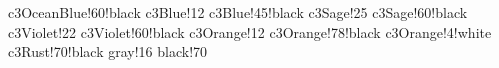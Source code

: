 \documentclass{llmxive}
\providecommand{\cPale}[1]{#1!4!white}
\providecommand{\cLight}[1]{#1!8}
\providecommand{\cFill}[1]{#1!12}
\providecommand{\cTok}[1]{#1!22}
\providecommand{\cSoft}[1]{#1!50!gray}
\providecommand{\cBorder}[1]{#1!50!black}
\begin{document}
      {c3OceanBlue!60!black}%
 {c3Blue!12}%
 {c3Blue!45!black}%
     {c3Sage!25}%
     {c3Sage!60!black}%
    {c3Violet!22}%
    {c3Violet!60!black}%
    {c3Orange!12}%
    {c3Orange!78!black}%
    {c3Orange!4!white}%
    {c3Rust!70!black}%
     {gray!16}%
     {black!70}%
%
%
%
\providecommand{\cPale}  [1]{#1!4!white}%
\providecommand{\cLight} [1]{#1!8}%
\providecommand{\cFill}  [1]{#1!12}%
\providecommand{\cTok}   [1]{#1!22}%
\providecommand{\cSoft}  [1]{#1!50!gray}%
\providecommand{\cBorder}[1]{#1!50!black}%
%
\end{document}
